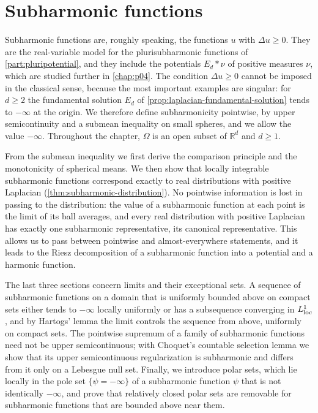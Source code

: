 \chapter{Subharmonic functions}
\label{chap:p03}
Subharmonic functions are, roughly speaking, the functions $u$ with $\Delta u\geq0$. They are the real-variable model for the plurisubharmonic functions of \cref{part:pluripotential}, and they include the potentials $E_d*\nu$ of positive measures $\nu$, which are studied further in \cref{chap:p04}. The condition $\Delta u\geq0$ cannot be imposed in the classical sense, because the most important examples are singular: for $d\geq2$ the fundamental solution $E_d$ of \cref{prop:laplacian-fundamental-solution} tends to $-\infty$ at the origin. We therefore define subharmonicity pointwise, by upper semicontinuity and a submean inequality on small spheres, and we allow the value $-\infty$. Throughout the chapter, $\Omega$ is an open subset of $\mathbb R^d$ and $d\geq1$.

From the submean inequality we first derive the comparison principle and the monotonicity of spherical means. We then show that locally integrable subharmonic functions correspond exactly to real distributions with positive Laplacian (\cref{thm:subharmonic-distribution}). No pointwise information is lost in passing to the distribution: the value of a subharmonic function at each point is the limit of its ball averages, and every real distribution with positive Laplacian has exactly one subharmonic representative, its canonical representative. This allows us to pass between pointwise and almost-everywhere statements, and it leads to the Riesz decomposition of a subharmonic function into a potential and a harmonic function.

The last three sections concern limits and their exceptional sets. A sequence of subharmonic functions on a domain that is uniformly bounded above on compact sets either tends to $-\infty$ locally uniformly or has a subsequence converging in $L^1_{\mathrm{loc}}$, and by Hartogs' lemma the limit controls the sequence from above, uniformly on compact sets. The pointwise supremum of a family of subharmonic functions need not be upper semicontinuous; with Choquet's countable selection lemma we show that its upper semicontinuous regularization is subharmonic and differs from it only on a Lebesgue null set. Finally, we introduce polar sets, which lie locally in the pole set $\{\psi=-\infty\}$ of a subharmonic function $\psi$ that is not identically $-\infty$, and prove that relatively closed polar sets are removable for subharmonic functions that are bounded above near them.

